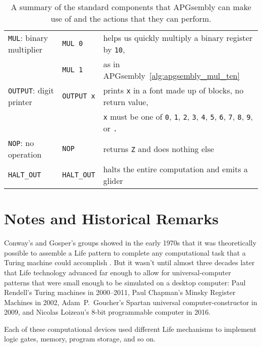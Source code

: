\begin{table}[!htb]
\begin{center}
\begin{tabular}{lll}
			\texttt{MUL}: binary multiplier & \texttt{MUL 0} & helps us quickly multiply a binary register by \texttt{10}, \\
			& \texttt{MUL 1} & as in APGsembly~\ref{alg:apgsembly_mul_ten} \\\midrule
			\texttt{OUTPUT}: digit printer & \texttt{OUTPUT x} & prints \texttt{x} in a font made up of blocks, no return value,\\
			& & \texttt{x} must be one of \texttt{0}, \texttt{1}, \texttt{2}, \texttt{3}, \texttt{4}, \texttt{5}, \texttt{6}, \texttt{7}, \texttt{8}, \texttt{9}, or \texttt{.}\\\midrule
			
			\texttt{NOP}: no operation & \texttt{NOP} & returns \texttt{Z} and does nothing else\\\midrule
			
			\texttt{HALT\_OUT} & \texttt{HALT\_OUT} & halts the entire computation and emits a glider\\
			\bottomrule
		\end{tabular}
	\end{center}
	\caption{A summary of the standard components that APGsembly can make use of and the actions that they can perform.}\label{tab:universal_computation_components}
\end{table}


\section*{Notes and Historical Remarks}


Conway's and Gosper's groups showed in the early 1970s that it was theoretically possible to assemble a Life pattern to complete any computational task that a Turing machine could accomplish \cite{BCG82}. But it wasn't until almost three decades later that Life technology advanced far enough to allow for universal-computer patterns that were small enough to be simulated on a desktop computer:  Paul Rendell's Turing machines in 2000--2011, Paul Chapman's Minsky Register Machines in 2002, Adam~P.~Goucher's Spartan universal computer-constructor in 2009, and Nicolas Loizeau's 8-bit programmable computer in 2016.

Each of these computational devices used different Life mechanisms to implement logic gates, memory, program storage, and so on.

